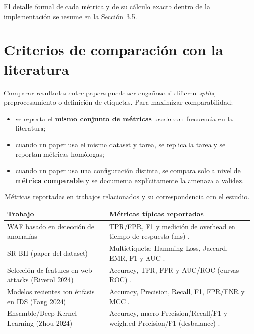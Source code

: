\documentclass[12pt,oneside]{report}
\begin{document}
El detalle formal de cada métrica y de su cálculo exacto dentro de la implementación se resume en la Sección~3.5.

\section{Criterios de comparación con la literatura}
Comparar resultados entre papers puede ser engañoso si difieren \textit{splits}, preprocesamiento o definición de etiquetas. Para maximizar comparabilidad:
\begin{itemize}[leftmargin=*]
  \item se reporta el \textbf{mismo conjunto de métricas} usado con frecuencia en la literatura;
  \item cuando un paper usa el mismo dataset y tarea, se replica la tarea y se reportan métricas homólogas;
  \item cuando un paper usa una configuración distinta, se compara solo a nivel de \textbf{métrica comparable} y se documenta explícitamente la amenaza a validez.
\end{itemize}

\begin{table}[H]
\centering
\caption{Métricas reportadas en trabajos relacionados y su correspondencia con el estudio.}
\label{tab:metricas_relacionadas}
\footnotesize
\setlength{\tabcolsep}{5pt}
\renewcommand{\arraystretch}{1.2}
\begin{tabularx}{\textwidth}{@{}L{3.6cm}Y@{}}
\toprule
\textbf{Trabajo} & \textbf{Métricas típicas reportadas} \\
\midrule
WAF basado en detección de anomalías & TPR/FPR, F1 y medición de overhead en tiempo de respuesta (ms) \cite{ocswaf_zenodo}. \\
SR-BH (paper del dataset) & Multietiqueta: Hamming Loss, Jaccard, EMR, F1 y AUC \cite{srbh_paper}. \\
Selección de features en web attacks (Riverol 2024) & Accuracy, TPR, FPR y AUC/ROC (curvas ROC) \cite{riverol_2024}. \\
Modelos recientes con énfasis en IDS (Fang 2024) & Accuracy, Precision, Recall, F1, FPR/FNR y MCC \cite{fang_2024,chicco_mcc}. \\
Ensamble/Deep Kernel Learning (Zhou 2024) & Accuracy, macro Precision/Recall/F1 y weighted Precision/F1 (desbalance) \cite{zhou_2024}. \\
\bottomrule
\end{tabularx}
\end{table}
\end{document}
